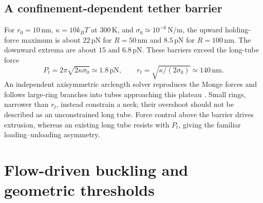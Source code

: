 
\subsection{A confinement-dependent tether barrier}
For $r_0=10\,\mathrm{nm}$, $\kappa=10k_BT$ at $300\,\mathrm K$, and $\sigma_0\simeq10^{-6}\,\mathrm{N/m}$, the upward holding-force maximum is about $22\,\mathrm{pN}$ for $R=50\,\mathrm{nm}$ and $8.5\,\mathrm{pN}$ for $R=100\,\mathrm{nm}$. The downward extrema are about $15$ and $6.8\,\mathrm{pN}$. These barriers exceed the long-tube force
\begin{equation}
P_t=2\pi\sqrt{2\kappa\sigma_0}\simeq1.8\,\mathrm{pN},\qquad r_t=\sqrt{\kappa/(2\sigma_0)}\simeq140\,\mathrm{nm}.\label{eq:tether}
\end{equation}
An independent axisymmetric arclength solver reproduces the Monge forces and follows large-ring branches into tubes approaching this plateau \cite{tethers}. Small rings, narrower than $r_t$, instead constrain a neck; their overshoot should not be described as an unconstrained long tube. Force control above the barrier drives extrusion, whereas an existing long tube resists with $P_t$, giving the familiar loading--unloading asymmetry.

\clearpage
\section{Flow-driven buckling and geometric thresholds}
